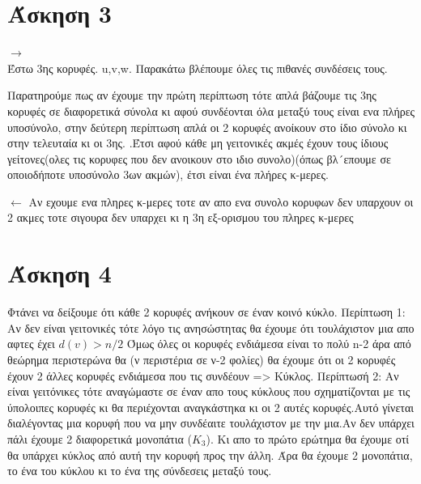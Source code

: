 \documentclass{article}
\begin{document}
	\section*{Άσκηση 3}
	$\rightarrow$ \\
	Έστω 3ης κορυφές. u,v,w. Παρακάτω βλέπουμε όλες τις πιθανές συνδέσεις τους.
	\begin{figure}[ht!]\centering
	\end{figure}
	Παρατηρούμε  πως αν έχουμε την πρώτη περίπτωση τότε απλά βάζουμε τις 3ης κορυφές σε διαφορετικά σύνολα κι αφού συνδέονται όλα μεταξύ τους είναι ενα πλήρες υποσύνολο, στην δεύτερη περίπτωση απλά οι 2 κορυφές ανοίκουν στο ίδιο σύνολο κι στην τελευταία κι οι 3ης. .Έτσι αφού κάθε μη γειτονικές ακμές έχουν τους ίδιους γείτονες(ολες τις κορυφες που δεν ανοικουν στο ιδιο συνολο)(όπως βλ´επουμε σε οποιοδήποτε υποσύνολο 3ων ακμών), έτσι είναι ένα πλήρες κ-μερες.
	
	$\leftarrow$ Αν εχουμε ενα πληρες κ-μερες τοτε αν απο ενα συνολο κορυφων δεν υπαρχουν οι 2 ακμες τοτε σιγουρα δεν υπαρχει κι η 3η εξ-ορισμου του πληρες κ-μερες
	\section*{Άσκηση 4}
	Φτάνει να δείξουμε ότι κάθε 2 κορυφές ανήκουν σε έναν κοινό κύκλο. Περίπτωση 1:
    Αν δεν είναι γειτονικές τότε λόγο τις ανησώστητας θα έχουμε ότι τουλάχιστον μια απο αφτες έχει $d(v)>n/2$ Όμως όλες οι κορυφές ενδιάμεσα είναι το πολύ n-2 άρα από θεώρημα περιστερώνα θα (ν περιστέρια σε ν-2 φολίες) θα έχουμε ότι οι 2 κορυφές έχουν 2 άλλες κορυφές ενδιάμεσα που τις συνδέουν => Κύκλος.
    Περίπτωσή 2: Αν είναι γειτόνικες τότε αναγώμαστε σε έναν απο τους κύκλους που σχηματίζονται με τις ύπολοιπες κορυφές κι θα περιέχονται αναγκάστηκα κι οι 2 αυτές κορυφές.Αυτό γίνεται διαλέγοντας μια κορυφή που να μην συνδέαιτε τουλάχιστον με την μια.Αν δεν υπάρχει πάλι έχουμε 2 διαφορετικά μονοπάτια ($K_3$). Κι απο το πρώτο ερώτημα θα έχουμε οτί θα υπάρχει κύκλος από αυτή την κορυφή προς την άλλη. Άρα θα έχουμε 2 μονοπάτια, το ένα του κύκλου κι το ένα της σύνδεσεις μεταξύ τους.
\end{document}
